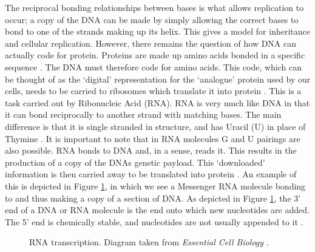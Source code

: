 \documentclass{cshonours}
\begin{document}
The reciprocal bonding relationships between bases is what allows replication to occur; a copy of the DNA can be made by simply allowing the correct bases to bond to one of the strands making up its helix. This gives a model for inheritance and cellular replication. However, there remains the question of how DNA can actually code for protein. Proteins are made up amino acids bonded in a specific sequence \cite{albertsessential}. The DNA must therefore code for amino acids. This code, which can be thought of as the `digital' representation for the `analogue' protein used by our cells, needs to be carried to ribosomes which translate it into protein \cite{albertsessential}. This is a task carried out by Ribonucleic Acid (RNA). RNA is very much like DNA in that it can bond reciprocally to another strand with matching bases. The main difference is that it is single stranded in structure, and has Uracil (U) in place of Thymine \cite{albertsessential}. It is important to note that in RNA molecules G and U pairings are also possible. RNA bonds to DNA and, in a sense, reads it. This results in the production of a copy of the DNAs genetic payload. This `downloaded' information is then carried away to be translated into protein \cite{albertsessential}. An example of this is depicted in Figure \ref{transcription}, in which we see a Messenger RNA molecule bonding to and thus making a copy of a section of DNA. As depicted in Figure \ref{transcription}, the 3' end of a DNA or RNA molecule is the end onto which new nucleotides are added. The 5' end is chemically stable, and nucleotides are not usually appended to it \cite{albertsessential}.

\begin{figure}
\begin{center}
\end{center}
\caption{RNA transcription. Diagram taken from \emph{Essential Cell Biology} \cite{albertsessential}.}
\label{transcription}
\end{figure}
\end{document}
